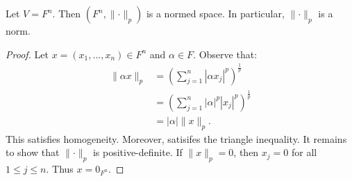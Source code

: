     \begin{theorem}
        Let $V = F^n$. Then $(F^n, \lVert \cdot \rVert _p)$ is a normed space. In particular, $\lVert \cdot \rVert _p$ is a norm.
    \end{theorem}
        \begin{proof}
            Let $x = (x_1,...,x_n) \in F^n$ and $\alpha \in F$. Observe that:
                \begin{equation*}
                \begin{split}
                    \lVert  \alpha x \rVert _p
                    & = \left(\sum_{j = 1}^n |\alpha x_j|^p\right)^\frac{1}{p} \\
                    & = \left(\sum_{j = 1}^n |\alpha|^p |x_j|^p\right)^\frac{1}{p} \\
                    & = |\alpha| \lVert x \rVert _p.
                \end{split}
                \end{equation*}
            This satisfies homogeneity. Moreover,  satisifes the triangle inequality. It remains to show that $\lVert \cdot \rVert _p$ is positive-definite. If $\lVert x \rVert _p = 0$, then $x_j = 0$ for all $1 \leq j \leq n$. Thus $x = 0_{F^n}$.
        \end{proof}


